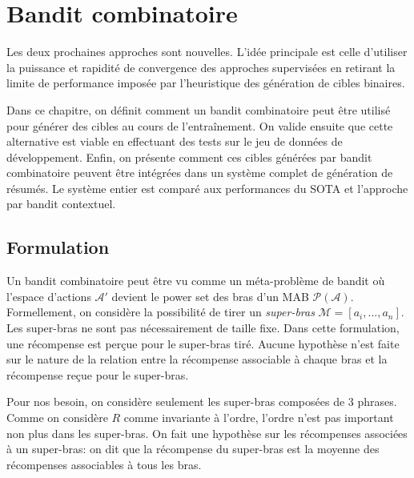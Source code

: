\chapter{Bandit combinatoire}
\label{chap:bandit_combi}                   %

Les deux prochaines approches sont nouvelles.
L'idée principale est celle d'utiliser la puissance et rapidité de convergence
des approches supervisées en retirant la limite de performance imposée
par l'heuristique des génération de cibles binaires.

Dans ce chapitre, on définit comment un bandit combinatoire peut être utilisé
pour générer des cibles au cours de l'entraînement.
On valide ensuite que cette alternative est viable en effectuant des tests sur
le jeu de données de développement.
Enfin, on présente comment ces cibles générées par bandit combinatoire peuvent
être intégrées dans un système complet de génération de résumés.
Le système entier est comparé aux performances du SOTA et l'approche par bandit
contextuel.

\section{Formulation}
\label{section:formulation_combi}

Un bandit combinatoire peut être vu comme un méta-problème de bandit où l'espace
d'actions $\mathcal{A}'$ devient le power set des bras d'un MAB $\mathscr{P}(\mathcal{A})$.
Formellement, on considère la possibilité de tirer un \textit{super-bras} $\mathcal{M} = [a_i, ..., a_n]$.
Les super-bras ne sont pas nécessairement de taille fixe.
Dans cette formulation, une récompense est perçue pour le super-bras tiré.
Aucune hypothèse n'est faite sur le nature de la relation entre la récompense associable à
chaque bras et la récompense reçue pour le super-bras.

Pour nos besoin, on considère seulement les super-bras composées de 3 phrases.
Comme on considère $R$ comme invariante à l'ordre, l'ordre n'est pas important non
plus dans les super-bras.
On fait une hypothèse sur les récompenses associées à un super-bras: on dit que
la récompense du super-bras est la moyenne des récompenses associables à tous
les bras.


